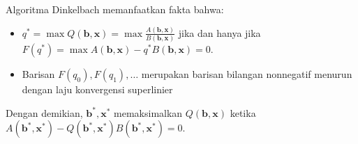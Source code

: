 Algoritma Dinkelbach memanfaatkan fakta bahwa:
\begin{itemize}
  \item{$q^*=\max Q(\mathbf{b},\mathbf{x})=\max\frac{A(\mathbf{b},\mathbf{x})}{B(\mathbf{b},\mathbf{x})}$ jika dan hanya jika $F(q^*)=\max A(\mathbf{b},\mathbf{x})-q^*B(\mathbf{b},\mathbf{x})=0$.} 
  \item{Barisan $F(q_0), F(q_1), \dots$ merupakan barisan bilangan nonnegatif menurun dengan laju konvergensi superlinier}
\end{itemize}

Dengan demikian, $\mathbf{b}^*, \mathbf{x}^*$ memaksimalkan $Q(\mathbf{b},\mathbf{x})$ ketika $A(\mathbf{b}^*,\mathbf{x}^*)-Q(\mathbf{b}^*,\mathbf{x}^*)B(\mathbf{b}^*,\mathbf{x}^*)=0$. 
